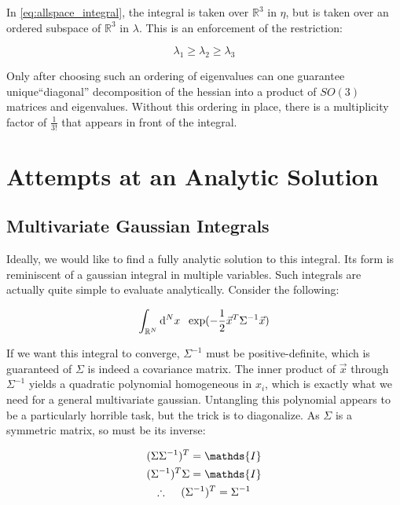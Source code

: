 \documentclass[10pt,letterpaper]{article}
\def\d{{\rm d}}  %
\begin{document}
In \ref{eq:allspace_integral}, the integral is taken over $\mathbb{R}^3$ in $\eta$, but is taken over an ordered subspace of $\mathbb{R}^3$ in $\lambda$. This is an enforcement of the restriction:

\begin{equation} \label{eq:ordering}
\lambda_1 \geq \lambda_2 \geq \lambda_3
\end{equation}

Only after choosing such an ordering of eigenvalues can one guarantee unique``diagonal'' decomposition of the hessian into a product of $SO(3)$ matrices and eigenvalues. Without this ordering in place, there is a multiplicity factor of $\frac{1}{3!}$ that appears in front of the integral.

\section{Attempts at an Analytic Solution} \label{analytic}

\subsection{Multivariate Gaussian Integrals}

Ideally, we would like to find a fully analytic solution to this integral. Its form is reminiscent of a gaussian integral in multiple variables. Such integrals are actually quite simple to evaluate analytically. Consider the following:

\begin{equation} \label{eq:multigaus}
\int_{\mathbb{R}^N} \d^N x \hspace{0.5pc} \exp(-\frac{1}{2} \vec{x}^T \Sigma^{-1} \vec{x})
\end{equation}

If we want this integral to converge, $\Sigma^{-1}$ must be positive-definite, which is guaranteed of $\Sigma$ is indeed a covariance matrix. The inner product of $\vec{x}$ through $\Sigma^{-1}$ yields a quadratic polynomial homogeneous in $x_i$, which is exactly what we need for a general multivariate gaussian. Untangling this polynomial appears to be a particularly horrible task, but the trick is to diagonalize.
As $\Sigma$ is a symmetric matrix, so must be its inverse:

\begin{gather*}
(\Sigma \Sigma^{-1})^T = \mathds{I} \\
(\Sigma^{-1})^T \Sigma = \mathds{I} \\
\therefore \hspace{1pc}  (\Sigma^{-1})^T = \Sigma^{-1}
\end{gather*}
\end{document}
